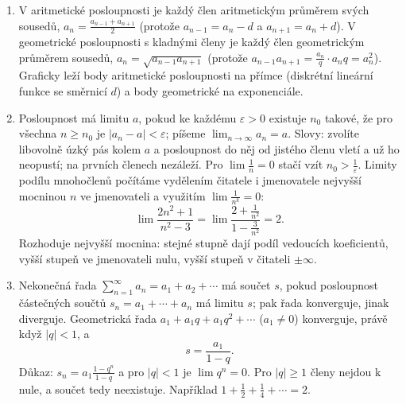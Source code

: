 \begin{enumerate}[label=\textbf{\arabic*.}, leftmargin=*, itemsep=0.8em]
  \item {}
  V aritmetické posloupnosti je každý člen aritmetickým průměrem svých sousedů, $a_n = \frac{a_{n-1} + a_{n+1}}{2}$ (protože $a_{n-1} = a_n - d$ a $a_{n+1} = a_n + d$). V geometrické posloupnosti s kladnými členy je každý člen geometrickým průměrem sousedů, $a_n = \sqrt{a_{n-1}a_{n+1}}$ (protože $a_{n-1}a_{n+1} = \frac{a_n}{q}\cdot a_nq = a_n^2$). Graficky leží body aritmetické posloupnosti na přímce (diskrétní lineární funkce se směrnicí $d$) a body geometrické na exponenciále.

  \item {}
  Posloupnost má limitu $a$, pokud ke každému $\varepsilon > 0$ existuje $n_0$ takové, že pro všechna $n\geq n_0$ je $|a_n - a| < \varepsilon$; píšeme $\lim_{n\to\infty} a_n = a$. Slovy: zvolíte libovolně úzký pás kolem $a$ a posloupnost do něj od jistého členu vletí a už ho neopustí; na prvních členech nezáleží. Pro $\lim\frac{1}{n} = 0$ stačí vzít $n_0 > \frac{1}{\varepsilon}$. Limity podílu mnohočlenů počítáme vydělením čitatele i jmenovatele nejvyšší mocninou $n$ ve jmenovateli a využitím $\lim\frac{1}{n^k} = 0$:
  \begin{equation*}
    \lim\frac{2n^2 + 1}{n^2 - 3} = \lim\frac{2 + \frac{1}{n^2}}{1 - \frac{3}{n^2}} = 2.
  \end{equation*}
  Rozhoduje nejvyšší mocnina: stejné stupně dají podíl vedoucích koeficientů, vyšší stupeň ve jmenovateli nulu, vyšší stupeň v čitateli $\pm\infty$. 

  \item {}
  Nekonečná řada $\sum_{n=1}^{\infty} a_n = a_1 + a_2 + \cdots$ má součet $s$, pokud posloupnost částečných součtů $s_n = a_1 + \cdots + a_n$ má limitu $s$; pak řada konverguje, jinak diverguje. Geometrická řada $a_1 + a_1q + a_1q^2 + \cdots$ ($a_1\neq 0$) konverguje, právě když $|q| < 1$, a
  \begin{equation*}
    s = \frac{a_1}{1 - q}.
  \end{equation*}
  Důkaz: $s_n = a_1\frac{1 - q^n}{1 - q}$ a pro $|q| < 1$ je $\lim q^n = 0$. Pro $|q|\geq 1$ členy nejdou k nule, a součet tedy neexistuje. Například $1 + \frac{1}{2} + \frac{1}{4} + \cdots = 2$. 


\end{enumerate}
